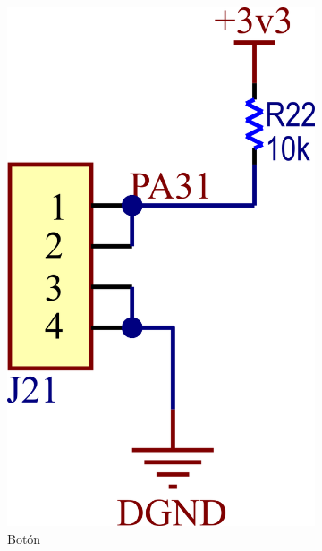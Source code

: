 \documentclass[titlepage, 12pt]{article}
\begin{document}
\begin{figure}[!htbp]
        \begin{subfigure}[b]{0.49\textwidth}
            \centering
            \includegraphics[scale=1.1]{images/arm-button.png}
            \caption{Botón}
            \label{fig:arm-button}
        \end{subfigure}
        \begin{subfigure}[b]{0.49\textwidth}
            \centering

\end{subfigure}
\end{figure}
\end{document}
